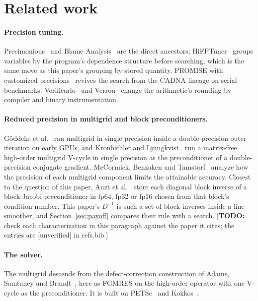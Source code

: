 \documentclass[11pt]{article}
\newcommand{\todo}[1]{\textcolor{red!70!black}{\small[\textbf{TODO:} #1]}}
\begin{document}
\section{Related work}
\label{sec:related}

\paragraph{Precision tuning.}  Precimonious~\cite{precimonious} and Blame
Analysis~\cite{blame} are the direct ancestors; HiFPTuner~\cite{hifptuner} groups variables by
the program's dependence structure before searching, which is the same move as this paper's
grouping by stored quantity.  PROMISE with customized precisions~\cite{promise2026} revives the
search from the CADNA lineage on serial benchmarks.  Verificarlo~\cite{verificarlo} and
Verrou~\cite{verrou} change the arithmetic's rounding by compiler and binary instrumentation.

\paragraph{Reduced precision in multigrid and block preconditioners.}  Göddeke et
al.~\cite{goeddeke2007} ran multigrid in single precision inside a double-precision outer
iteration on early GPUs, and Kronbichler and Ljungkvist~\cite{kronbichler2019} run a matrix-free
high-order multigrid V-cycle in single precision as the preconditioner of a double-precision
conjugate gradient.  McCormick, Benzaken and Tamstorf~\cite{mccormick2021,tamstorf2021} analyze
how the precision of each multigrid component limits the attainable accuracy.  Closest to the
question of this paper, Anzt et al.~\cite{anzt2019adaptive,flegar2021ginkgo} store each
diagonal block inverse of a block-Jacobi preconditioner in fp64, fp32 or fp16 chosen from that
block's condition number.  This paper's $D^{-1}$ is such a set of block inverses inside a line
smoother, and Section~\ref{sec:payoff} compares their rule with a search.
\todo{check each characterization in this paragraph against the paper it cites; the entries are
[unverified] in refs.bib.}

\paragraph{The solver.}  The multigrid descends from the defect-correction construction of
Adams, Samtaney and Brandt~\cite{AdamsSamtaneyBrandt2010}, here as FGMRES on the high-order
operator with one V-cycle as the preconditioner.  It is built on PETSc~\cite{petsc} and
Kokkos~\cite{kokkos}.
\end{document}
